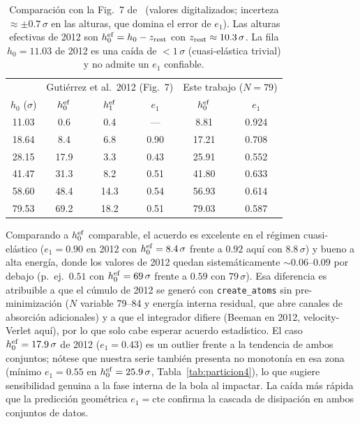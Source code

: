 \documentclass[aps,pre,twocolumn,reprint,superscriptaddress]{revtex4-2}
\begin{document}
\begin{table}[tp]
\centering
\small
\caption{Comparación con la Fig.~7 de~\cite{Gutierrez2012} (valores
digitalizados; incerteza $\approx\pm0.7\,\sigma$ en las alturas, que domina
el error de $e_1$). Las alturas efectivas de 2012 son
$h_0^{\rm ef}=h_0-z_{\rm rest}$ con $z_{\rm rest}\approx10.3\,\sigma$.
La fila $h_0=11.03$ de 2012 es una caída de $<1\,\sigma$ (cuasi-elástica
trivial) y no admite un $e_1$ confiable.}
\label{tab:comparacion2012}
\begin{tabular}{c|ccc|cc}
\toprule
 & \multicolumn{3}{c|}{Gutiérrez et al.\ 2012 (Fig.~7)} &
 \multicolumn{2}{c}{Este trabajo ($N=79$)} \\
$h_0$ ($\sigma$) & $h_0^{\rm ef}$ & $h_1^{\rm ef}$ & $e_1$ &
$h_0^{\rm ef}$ & $e_1$ \\
\midrule
11.03 &  0.6 &  0.4 & ---  &  8.81 & 0.924 \\
18.64 &  8.4 &  6.8 & 0.90 & 17.21 & 0.708 \\
28.15 & 17.9 &  3.3 & 0.43 & 25.91 & 0.552 \\
41.47 & 31.3 &  8.2 & 0.51 & 41.80 & 0.633 \\
58.60 & 48.4 & 14.3 & 0.54 & 56.93 & 0.614 \\
79.53 & 69.2 & 18.2 & 0.51 & 79.03 & 0.587 \\
\bottomrule
\end{tabular}
\end{table}

Comparando a $h_0^{\rm ef}$ comparable, el acuerdo es excelente en el
régimen cuasi-elástico ($e_1=0.90$ en 2012 con $h_0^{\rm ef}=8.4\,\sigma$
frente a $0.92$ aquí con $8.8\,\sigma$) y bueno a alta energía, donde los
valores de 2012 quedan sistemáticamente $\sim0.06$--$0.09$ por debajo
(p.~ej.\ $0.51$ con $h_0^{\rm ef}=69\,\sigma$ frente a $0.59$ con
$79\,\sigma$). Esa diferencia es atribuible a que el cúmulo de 2012 se
generó con \texttt{create\_atoms} sin pre-minimización ($N$ variable
79--84 y energía interna residual, que abre canales de absorción
adicionales) y a que el integrador difiere (Beeman en 2012,
velocity-Verlet aquí), por lo que solo cabe esperar acuerdo estadístico.
El caso $h_0^{\rm ef}=17.9\,\sigma$ de 2012 ($e_1=0.43$) es un outlier
frente a la tendencia de ambos conjuntos; nótese que nuestra serie también
presenta no monotonía en esa zona (mínimo $e_1=0.55$ en
$h_0^{\rm ef}=25.9\,\sigma$, Tabla~\ref{tab:particion4}), lo que sugiere
sensibilidad genuina a la fase interna de la bola al impactar.
La caída más rápida que la predicción geométrica $e_1=\mathrm{cte}$
confirma la cascada de disipación en ambos conjuntos de datos.
\end{document}
